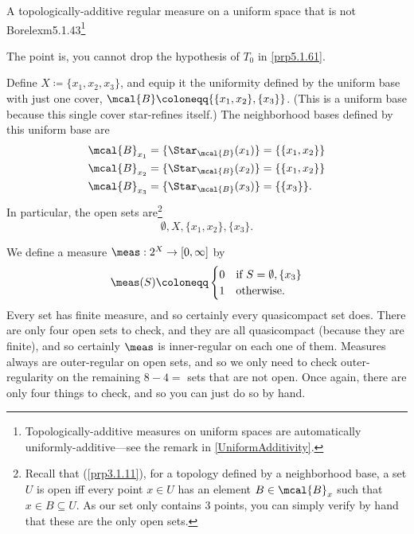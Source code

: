 \begin{exm}{A topologically-additive regular measure on a uniform space that is not Borel}{exm5.1.43}\footnote{Topologically-additive measures on uniform spaces are automatically uniformly-additive---see the remark in \cref{UniformAdditivity}.}
\begin{rmk}
The point is, you cannot drop the hypothesis of $T_0$ in \cref{prp5.1.61}.
\end{rmk}
Define $X\coloneqq \{ x_1,x_2,x_3\}$, and equip it the uniformity defined by the uniform base with just one cover, $\mcal{B}\coloneqq \{ \{ x_1,x_2\} ,\{ x_3\} \}$.  (This is a uniform base because this single cover star-refines itself.)  The neighborhood bases defined by this uniform base are
\begin{equation}
\begin{split}
\mcal{B}_{x_1} & =\{ \Star _{\mcal{B}}(x_1)\} =\{ \{ x_1,x_2\} \} \\
\mcal{B}_{x_2} & =\{ \Star _{\mcal{B}}(x_2)\} =\{ \{ x_1,x_2\} \} \\
\mcal{B}_{x_3} & =\{ \Star _{\mcal{B}}(x_3)\} =\{ \{ x_3\} \} .
\end{split}
\end{equation}
In particular, the open sets are\footnote{Recall that (\cref{prp3.1.11}), for a topology defined by a neighborhood base, a set $U$ is open iff every point $x\in U$ has an element $B\in \mcal{B}_x$ such that $x\in B\subseteq U$.  As our set only contains $3$ points, you can simply verify by hand that these are the only open sets.}
\begin{equation}
\emptyset ,X,\{ x_1,x_2\} ,\{ x_3\} .
\end{equation}

We define a measure $\meas :2^X\rightarrow [0,\infty ]$ by
\begin{equation}
\meas (S)\coloneqq \begin{cases}0 & \text{if }S=\emptyset ,\{ x_3\} \\ 1 & \text{otherwise.}\end{cases}
\end{equation}
Every set has finite measure, and so certainly every quasicompact set does.  There are only four open sets to check, and they are all quasicompact (because they are finite), and so certainly $\meas$ is inner-regular on each one of them.  Measures always are outer-regular on open sets, and so we only need to check outer-regularity on the remaining $8-4=$ sets that are not open.  Once again, there are only four things to check, and so you can just do so by hand.


\end{exm}
